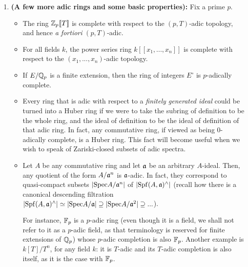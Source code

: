             \begin{example} \label{example: huber_rings}
                \noindent
                \begin{enumerate}
                    \item \textbf{(A few more adic rings and some basic properties):} Fix a prime $p$.
                        \begin{itemize}
                            \item The ring $\mathbb{Z}_p[\![T]\!]$ is complete with respect to the $(p, T)$-adic topology, and hence \textit{a fortiori} $(p, T)$-adic. 
                            \item For all fields $k$, the power series ring $k[\![x_1, ..., x_n]\!]$ is complete with respect to the $(x_1, ..., x_n)$-adic topology.
                            \item If $E/\mathbb{Q}_p$ is a finite extension, then the ring of integers $E^{\circ}$ is $p$-adically complete. 
                            \item Every ring that is adic with respect to a \textit{finitely generated ideal} could be turned into a Huber ring if we were to take the subring of definition to be the whole ring, and the ideal of definition to be the ideal of definition of that adic ring. In fact, any commutative ring, if viewed as being $0$-adically complete, is a Huber ring. This fact will become useful when we wish to speak of Zariski-closed subsets of adic spectra.
                            \item Let $A$ be any commutative ring and let $\mathfrak{a}$ be an arbitrary $A$-ideal. Then, any quotient of the form $A/\mathfrak{a}^n$ is $\mathfrak{a}$-adic. In fact, they correspond to quasi-compact subsets $|\mathrm{Spec} A/\mathfrak{a}^n|$ of $|\mathrm{Spf} (A, \mathfrak{a})^{\wedge}|$ (recall how there is a canonical descending filtration $|\mathrm{Spf} (A, \mathfrak{a})^{\wedge}| \simeq |\mathrm{Spec} A/\mathfrak{a}| \supseteq |\mathrm{Spec} A/\mathfrak{a}^2| \supseteq ...$).
                            
                            For instance, $\mathbb{F}_p$ is a $p$-adic ring (even though it is a field, we shall not refer to it as a $p$-adic field, as that terminology is reserved for finite extensions of $\mathbb{Q}_p$) whose $p$-adic completion is also $\mathbb{F}_p$. Another example is $k[T]/T^n$, for any field $k$: it is $T$-adic and its $T$-adic completion is also itself, as it is the case with $\mathbb{F}_p$. 
                            

\end{itemize}
\end{enumerate}
\end{example}

